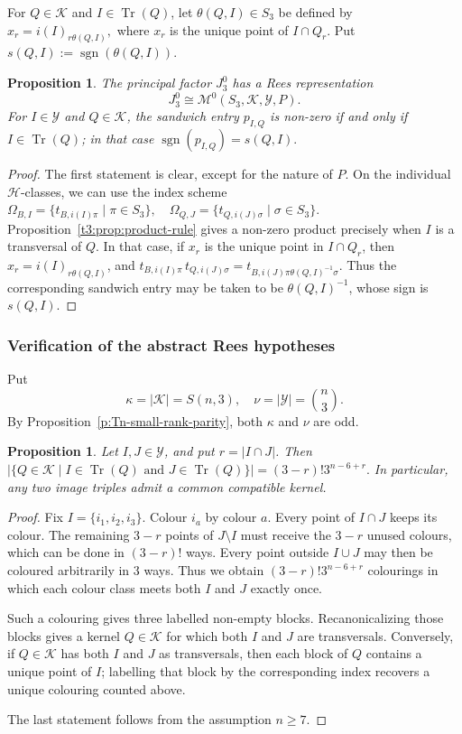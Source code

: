 \documentclass[11pt]{article}
\theoremstyle{plain}
\newtheorem{prop}[theorem]{Proposition}
\theoremstyle{remark}
\theoremstyle{definition}
\theoremstyle{plain}
\newcommand{\inv}{^{-1}}
\DeclareMathOperator{\sgn}{sgn}
\DeclareMathOperator{\Tr}{Tr}
\begin{document}
For $Q\in\mathcal K$ and $I\in\Tr(Q)$, let $\theta(Q,I)\in S_3$ be defined by
\(x_r=i(I)_{r\theta(Q,I)},\)
where $x_r$ is the unique point of $I\cap Q_r$. Put
\(s(Q,I):=\sgn(\theta(Q,I)).\)

\begin{prop}\label{t3:prop:rank-three-Rees-data}
The principal factor $J_3^0$ has a Rees representation
\[
J_3^0\cong \mathcal M^0(S_3,\mathcal K,\mathcal Y,P).
\]
For $I\in\mathcal Y$ and $Q\in\mathcal K$, the sandwich entry $p_{I,Q}$ is
non-zero if and only if $I\in\Tr(Q)$; in that case
\(\sgn(p_{I,Q})=s(Q,I).\)
\end{prop}

\begin{proof}
	The first statement is clear, except for the nature of $P$.
On the individual $\mathcal{H}$-classes, we can use the index scheme
\(\Omega_{B,I}=\{t_{B,i(I)\pi}\mid\pi\in S_3\},\quad \Omega_{Q,J}=\{t_{Q,i(J)\sigma}\mid\sigma\in S_3\}.\)
Proposition~\ref{t3:prop:product-rule} gives a non-zero product precisely when
$I$ is a transversal of $Q$. In that case, if $x_r$ is the unique point in $I\cap Q_r$, then
$x_r=i(I)_{r\theta(Q,I)}$, and
\(t_{B,i(I)\pi}\,t_{Q,i(J)\sigma} =t_{B,i(J)\pi{\theta(Q,I)\inv}\sigma}.\)
Thus the corresponding sandwich entry may be taken to be $\theta(Q,I)\inv$, whose
sign is $s(Q,I)$.
\end{proof}

\subsubsection[Verification of the abstract Rees hypotheses]{Verification of the abstract Rees hypotheses}
Put
\[
\kappa=|\mathcal K|=S(n,3),
        \quad
        \nu=|\mathcal Y|=\binom n3.
\]
By Proposition~\ref{p:Tn-small-rank-parity}, both $\kappa$ and $\nu$ are odd.

\begin{prop}\label{t3:prop:common-kernels}
Let $I,J\in\mathcal Y$, and put $r=|I\cap J|$. Then
\(|\{Q\in\mathcal K\mid I\in\Tr(Q)\text{ and }J\in\Tr(Q)\}|=(3-r)!3^{n-6+r}.\)
In particular, any two image triples admit a common compatible kernel.
\end{prop}

\begin{proof}
Fix $I=\{i_1,i_2,i_3\}$. Colour $i_a$ by colour $a$. Every point of
$I\cap J$ keeps its colour. The remaining $3-r$ points of $J\setminus I$ must
receive the $3-r$ unused colours, which can be done in $(3-r)!$ ways. Every
point outside $I\cup J$ may then be coloured arbitrarily in $3$ ways. Thus we
obtain $(3-r)!3^{n-6+r}$ colourings in which each colour class meets both $I$
and $J$ exactly once.

Such a colouring gives three labelled non-empty blocks. Recanonicalizing those
blocks gives a kernel $Q\in\mathcal K$ for which both $I$ and $J$ are
transversals. Conversely, if $Q\in\mathcal K$ has both $I$ and $J$ as
transversals, then each block of $Q$ contains a unique point of $I$; labelling
that block by the corresponding index recovers a unique colouring counted above.

The last statement follows from the assumption $n\ge7$.
\end{proof}
\end{document}
